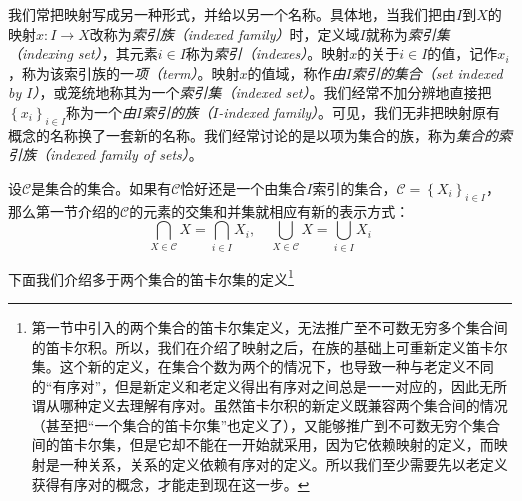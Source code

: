 \documentclass[../main.tex]{subfiles}
\begin{document}
我们常把映射写成另一种形式，并给以另一个名称。具体地，当我们把由$I$到$X$的映射$x:I\rightarrow X$改称为\emph{索引族（indexed family）}时，定义域$I$就称为\emph{索引集（indexing set）}，其元素$i\in I$称为\emph{索引（indexes）}。映射$x$的关于$i\in I$的值，记作$x_i$，称为该索引族的一\emph{项（term）}。映射$x$的值域，称作\emph{由$I$索引的集合（set indexed by $I$）}，或笼统地称其为一个\emph{索引集（indexed set）}。我们经常不加分辨地直接把$\left\{x_i\right\}_{i\in I}$称为一个\emph{由$I$索引的族（$I$-indexed family）}。可见，我们无非把映射原有概念的名称换了一套新的名称。我们经常讨论的是以项为集合的族，称为\emph{集合的索引族（indexed family of sets）}。

设$\mathcal{C}$是集合的集合。如果有$\mathcal{C}$恰好还是一个由集合$I$索引的集合，$\mathcal{C}=\left\{X_i\right\}_{i\in I}$，那么第一节介绍的$\mathcal{C}$的元素的交集和并集就相应有新的表示方式：
\[
    \bigcap_{X\in\mathcal{C}}X=\bigcap_{i\in I}X_i,\quad\bigcup_{X\in\mathcal{C}}X=\bigcup_{i\in I}X_i
\]

下面我们介绍多于两个集合的笛卡尔集的定义\footnote{第一节中引入的两个集合的笛卡尔集定义，无法推广至不可数无穷多个集合间的笛卡尔积。所以，我们在介绍了映射之后，在族的基础上可重新定义笛卡尔集。这个新的定义，在集合个数为两个的情况下，也导致一种与老定义不同的“有序对”，但是新定义和老定义得出有序对之间总是一一对应的，因此无所谓从哪种定义去理解有序对。虽然笛卡尔积的新定义既兼容两个集合间的情况（甚至把“一个集合的笛卡尔集”也定义了），又能够推广到不可数无穷个集合间的笛卡尔集，但是它却不能在一开始就采用，因为它依赖映射的定义，而映射是一种关系，关系的定义依赖有序对的定义。所以我们至少需要先以老定义获得有序对的概念，才能走到现在这一步。}
\end{document}

